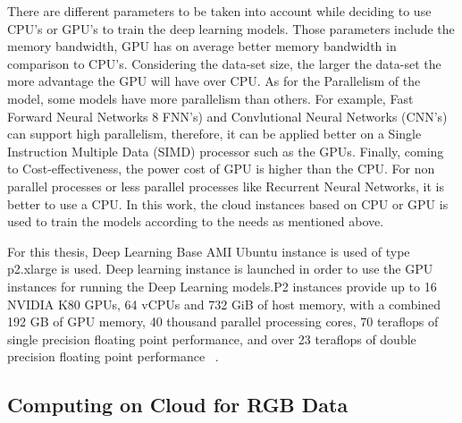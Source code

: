 There are different parameters to be taken into account while deciding to use CPU's or GPU's to train the deep learning models. Those parameters include the memory bandwidth, GPU has on average better memory bandwidth in comparison to CPU's. Considering the data-set size, the larger the data-set the more advantage the GPU will have over CPU. As for the Parallelism of the model, some models have more parallelism than others. For example, Fast Forward Neural Networks 8 FNN's) and Convlutional Neural Networks (CNN's) can support high parallelism, therefore, it can be applied better on a Single Instruction Multiple Data (SIMD) processor such as the GPUs. Finally, coming to Cost-effectiveness, the power cost of GPU is higher than the CPU. For non parallel processes or less parallel processes like Recurrent Neural Networks, it is better to use a CPU. In this work, the cloud instances based on CPU or GPU is used to train the models according to the needs as mentioned above.

For this thesis, Deep Learning Base AMI Ubuntu instance is used of type p2.xlarge is used. Deep learning instance is launched in order to use the GPU instances for running the Deep Learning models.P2 instances provide up to 16 NVIDIA K80 GPUs, 64 vCPUs and 732 GiB of host memory, with a combined 192 GB of GPU memory, 40 thousand parallel processing cores, 70 teraflops of single precision floating point performance, and over 23 teraflops of double precision floating point performance ~\cite{amazonec2}. 


\subsection{Computing on Cloud for RGB Data}

